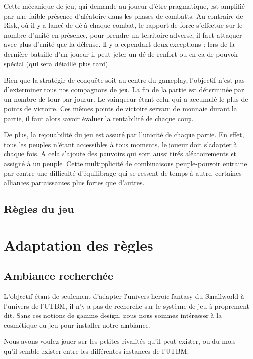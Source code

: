 \documentclass[11pt]{report}
\begin{document}
		Cette mécanique de jeu, qui demande au joueur d'être pragmatique, est amplifié par une faible présence d'aléatoire dans les phases de combatts. Au contraire de Risk\up{\copyright}, où il y a lancé de dé à chaque combat, le rapport de force s'effectue sur le nombre d'unité en présence, pour prendre un territoire adverse, il faut attaquer avec plus d'unité que la défense. Il y a cependant deux execptions : lors de la dernière bataille d'un joueur il peut jeter un dé de renfort ou en ca de pouvoir spécial (qui sera détaillé plus tard).
		
		Bien que la stratégie de conquête soit au centre du gameplay, l'objectif n'est pas d'exterminer tous nos compagnons de jeu. La fin de la partie est déterminée par un nombre de tour par joueur. Le vainqueur étant celui qui a accumulé le plus de points de victoire. Ces mêmes points de victoire servant de monnaie durant la partie, il faut alors savoir évaluer la rentabilité de chaque coup. 
		
		De plus, la rejouabilité du jeu est assuré par l'unicité de chaque partie. En effet, tous les peuples n'étant accessibles à tous moments, le joueur doit s'adapter à chaque fois. A cela s'ajoute des pouvoirs qui sont aussi tirés aléatoirements et assigné à un peuple. Cette multipplicité de combinaisons peuple-pouvoir entraine par contre une difficulté d'équilibrage qui se ressent de temps à autre, certaines alliances parraissantes plus fortes que d'autres.
	\section{Règles du jeu}

\chapter{Adaptation des règles}

	\section{Ambiance recherchée}
	
	L'objectif étant de seulement d'adapter l'univers heroic-fantasy du Smallworld\up{\copyright} à l'univers de l'UTBM, il n'y a pas de recherche sur le système de jeu à proprement dit. Sans ces notions de gamme design, nous nous sommes intéresser à la cosmétique du jeu pour installer notre ambiance. 
	
	Nous avons voulez jouer sur les petites rivalités qu'il peut exister, ou du mois qu'il semble exister entre les différentes instances de l'UTBM.  
\end{document}
